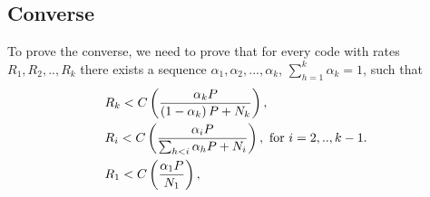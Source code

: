 \subsection{Converse}
To prove the converse, we need to prove that for every code with rates $R_1, R_2, .., R_k$ there exists a sequence $\alpha_1, \alpha_2, ... , \alpha_k$, $\sum_{h=1}^k\alpha_k = 1$, such that
\begin{align}
  \centering
  \begin{split}
    & R_k<C\left(\frac{\alpha_k P}{\left(1-\alpha_k\right)P + N_k}\right),\\
    & R_i<C\left(\frac{\alpha_i P}{\sum_{h<i}\alpha_h P +N_i}\right),\text{ for } i = 2,..,k-1.\\
    & R_{1}<C\left(\frac{\alpha_{1} P}{N_{1}}\right),\\
  \end{split}
\end{align}

